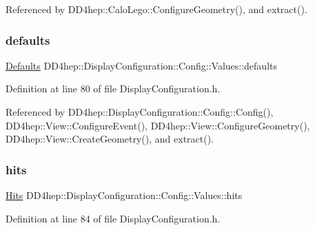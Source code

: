 Referenced by D\+D4hep\+::\+Calo\+Lego\+::\+Configure\+Geometry(), and extract().

\hypertarget{union_d_d4hep_1_1_display_configuration_1_1_config_1_1_values_af0a8cde0c8737c87ee05d38de1f93505}{}\label{union_d_d4hep_1_1_display_configuration_1_1_config_1_1_values_af0a8cde0c8737c87ee05d38de1f93505} 
\subsubsection{\texorpdfstring{defaults}{defaults}}
{\footnotesize\ttfamily \hyperlink{struct_d_d4hep_1_1_display_configuration_1_1_defaults}{Defaults} D\+D4hep\+::\+Display\+Configuration\+::\+Config\+::\+Values\+::defaults}



Definition at line 80 of file Display\+Configuration.\+h.



Referenced by D\+D4hep\+::\+Display\+Configuration\+::\+Config\+::\+Config(), D\+D4hep\+::\+View\+::\+Configure\+Event(), D\+D4hep\+::\+View\+::\+Configure\+Geometry(), D\+D4hep\+::\+View\+::\+Create\+Geometry(), and extract().

\hypertarget{union_d_d4hep_1_1_display_configuration_1_1_config_1_1_values_ab649c49cff98283b0349025bb35e329a}{}\label{union_d_d4hep_1_1_display_configuration_1_1_config_1_1_values_ab649c49cff98283b0349025bb35e329a} 
\subsubsection{\texorpdfstring{hits}{hits}}
{\footnotesize\ttfamily \hyperlink{struct_d_d4hep_1_1_display_configuration_1_1_hits}{Hits} D\+D4hep\+::\+Display\+Configuration\+::\+Config\+::\+Values\+::hits}



Definition at line 84 of file Display\+Configuration.\+h.



